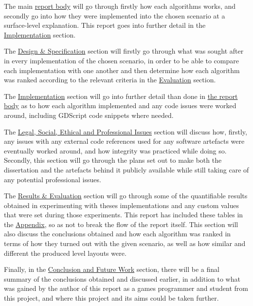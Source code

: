 \documentclass[11pt]{informatics-report}
\begin{document}
The main \hyperref[Body]{report body} will go through firstly how each algorithms works, and secondly go into how they were implemented into the chosen scenario at a surface-level explanation. This report goes into further detail in the \hyperref[Implementation]{Implementation} section.

The \hyperref[Design]{Design \& Specification} section will firstly go through what was sought after in every implementation of the chosen scenario, in order to be able to compare each implementation with one another and then determine how each algorithm was ranked according to the relevant criteria in the \hyperref[Evaluation]{Evaluation} section.

The \hyperref[Implementation]{Implementation} section will go into further detail than done in \hyperref[Body]{the report body} as to how each algorithm implemented and any code issues were worked around, including GDScript code snippets where needed.

The \hyperref[Issues]{Legal, Social, Ethical and Professional Issues} section will discuss how, firstly, any issues with any external code references used for any software artefacts were eventually worked around, and how integrity was practiced while doing so. Secondly, this section will go through the plans set out to make both the dissertation and the artefacts behind it publicly available while still taking care of any potential professional issues. 

The \hyperref[Evaluation]{Results \& Evaluation} section will go through some of the quantifiable results obtained in experimenting with theses implementations and any custom values that were set during those experiments. This report has included these tables in the \hyperref[Appendix]{Appendix}, so as not to break the flow of the report itself. This section will also discuss the conclusions obtained and how each algorithm was ranked in terms of how they turned out with the given scenario, as well as how similar and different the produced level layouts were.

Finally, in the \hyperref[Conclusion]{Conclusion and Future Work} section, there will be a final summary of the conclusions obtained and discussed earlier, in addition to what was gained by the author of this report as a games programmer and student from this project, and where this project and its aims could be taken further.












\appendix



\end{document}
